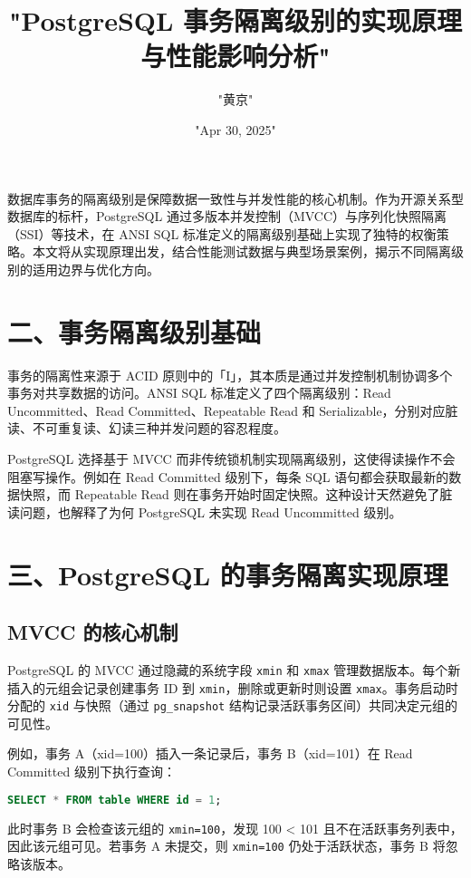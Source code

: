 \title{"PostgreSQL 事务隔离级别的实现原理与性能影响分析"}
\author{"黄京"}
\date{"Apr 30, 2025"}
\maketitle
数据库事务的隔离级别是保障数据一致性与并发性能的核心机制。作为开源关系型数据库的标杆，PostgreSQL 通过多版本并发控制（MVCC）与序列化快照隔离（SSI）等技术，在 ANSI SQL 标准定义的隔离级别基础上实现了独特的权衡策略。本文将从实现原理出发，结合性能测试数据与典型场景案例，揭示不同隔离级别的适用边界与优化方向。\par
\chapter{二、事务隔离级别基础}
事务的隔离性来源于 ACID 原则中的「I」，其本质是通过并发控制机制协调多个事务对共享数据的访问。ANSI SQL 标准定义了四个隔离级别：Read Uncommitted、Read Committed、Repeatable Read 和 Serializable，分别对应脏读、不可重复读、幻读三种并发问题的容忍程度。\par
PostgreSQL 选择基于 MVCC 而非传统锁机制实现隔离级别，这使得读操作不会阻塞写操作。例如在 Read Committed 级别下，每条 SQL 语句都会获取最新的数据快照，而 Repeatable Read 则在事务开始时固定快照。这种设计天然避免了脏读问题，也解释了为何 PostgreSQL 未实现 Read Uncommitted 级别。\par
\chapter{三、PostgreSQL 的事务隔离实现原理}
\section{MVCC 的核心机制}
PostgreSQL 的 MVCC 通过隐藏的系统字段 \verb!xmin! 和 \verb!xmax! 管理数据版本。每个新插入的元组会记录创建事务 ID 到 \verb!xmin!，删除或更新时则设置 \verb!xmax!。事务启动时分配的 \verb!xid! 与快照（通过 \verb!pg_snapshot! 结构记录活跃事务区间）共同决定元组的可见性。\par
例如，事务 A（xid=100）插入一条记录后，事务 B（xid=101）在 Read Committed 级别下执行查询：\par
\begin{lstlisting}[language=sql]
SELECT * FROM table WHERE id = 1;
\end{lstlisting}
此时事务 B 会检查该元组的 \verb!xmin=100!，发现 100 < 101 且不在活跃事务列表中，因此该元组可见。若事务 A 未提交，则 \verb!xmin=100! 仍处于活跃状态，事务 B 将忽略该版本。\par
